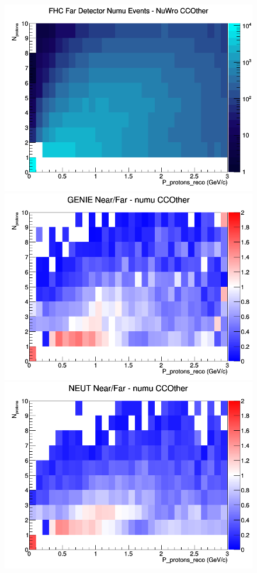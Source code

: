 \begin{figure}[h]
\endminipage
{}
\includegraphics[width=\linewidth]{eff_N_P/FGT/protons/CCOther_FHC_FD_numu_N_P_NuWro.png}
\endminipage
\newline
{}
\includegraphics[width=\linewidth]{eff_N_P/FGT/protons/ratios/CCOther_GENIE_numu_NF_N_P.png}
\endminipage
{}
\includegraphics[width=\linewidth]{eff_N_P/FGT/protons/ratios/CCOther_NEUT_numu_NF_N_P.png}

\end{figure}
